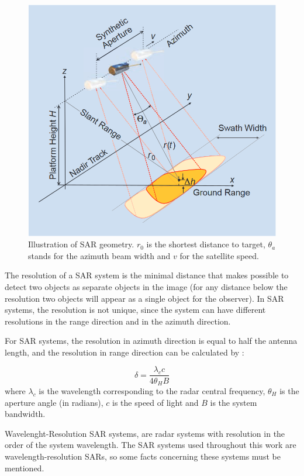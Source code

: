 \begin{figure}[H]
    \centering
    \includegraphics[width=0.8\linewidth]{Cap1-Bib Review/geometry.png}
    \caption{Illustration of SAR geometry. $r_0$ is the shortest distance to target, $\theta_a$ stands for the azimuth beam width and $v$ for the satellite speed. \cite{tutorial}}
    \label{fig:SAR_geometry}
\end{figure}{}

The resolution of a SAR system is the minimal distance that makes possible to detect two objects as separate objects in the image (for any distance below the resolution two objects will appear as a single object for the observer). In SAR systems, the resolution is not unique, since the system can have different resolutions in the range direction and in the azimuth direction. 

For SAR systems, the resolution in azimuth direction is equal to half the antenna length, and the resolution in range direction can be calculated by \cite{62}:

\begin{equation}
    \delta = \frac{\lambda_c c}{4 \theta_H B}
\end{equation}
where $\lambda_c$ is the wavelength corresponding to the radar central frequency, $\theta_H$
is the aperture angle (in radians), $c$ is the speed of light and $B$ is the system bandwidth.

Wavelenght-Resolution SAR systems, are radar systems with resolution in the order of the system wavelength. The SAR systems used throughout this work are wavelength-resolution SARs, so some facts concerning these systems must be mentioned. 

